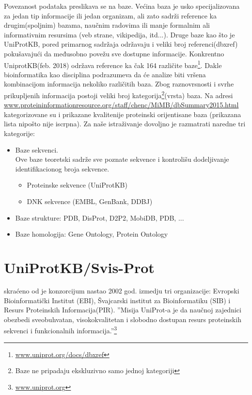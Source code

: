 Povezanost podataka preslikava se na baze. Većina baza je usko specijalizovana
za jedan tip informacije ili jedan organizam, ali zato sadrži reference ka
drugim(spoljnim) bazama, naučnim radovima ili  manje formalnim ali
informativnim resursima (veb strane, vikipedija, itd...). Druge baze kao što je
UniProtKB, pored primarnog sadržaja održavaju i veliki broj referenci(dbxref)
pokušavajući da međusobno povežu sve dostupne informacije. Konkrentno
UniprotKB(feb. 2018) održava reference ka čak 164 različite
baze\footnote{\url{www.uniprot.org/docs/dbxref}}.
Dakle bioinformatika kao disciplina podrazumeva da će analize biti vršena
kombinacijom informacija nekoliko različitih baza.  Zbog raznovrsnosti i svrhe
prikupljenih informacija postoji veliki broj kategorija\footnote{Baze ne
pripadaju ekskluzivno samo jednoj kategoriji}(vrsta) baza.  Na adresi
\url{www.proteininformationresource.org/staff/chenc/MiMB/dbSummary2015.html}
kategorizovane su i prikazane kvalitenije proteinski orijentisane baza
(prikazana lista nipošto nije iscrpna)\parencite{Chen2017}. Za naše
istraživanje dovoljno je razmatrati naredne tri kategorije:

\begin{itemize}
  \item Baze sekvenci.\\ 
        Ove baze teoretski sadrže sve poznate sekvence i kontrolišu dodeljivanje 
        identifikacionog broja sekvence.
    \begin{itemize}
      \item Proteinske sekvence (UniProtKB)
      \item DNK sekvence (EMBL, GenBank, DDBJ)
    \end{itemize}
  \item Baze strukture: PDB, DisProt, D2P2, MobiDB, PDB, ...
  \item Baze homologija: Gene Ontology, Protein Ontology
\end{itemize}


\section{UniProtKB/Svis-Prot}


 skraćeno od  je konzorcijum
nastao 2002 god. izmedju tri organizacije: Evropski Bioinformatički
Institut (EBI), Švajcarski institut za Bioinformatiku (SIB) i Resurs
Proteinskih Informacija(PIR).  ''Misija UniProt-a je da naučnoj zajednici
obezbedi sveobuhvatan, visokokvalitetan i slobodno dostupan resurs proteinskih
sekvenci i funkcionalnih informacija.''\footnote{\url{www.uniprot.org}} 


